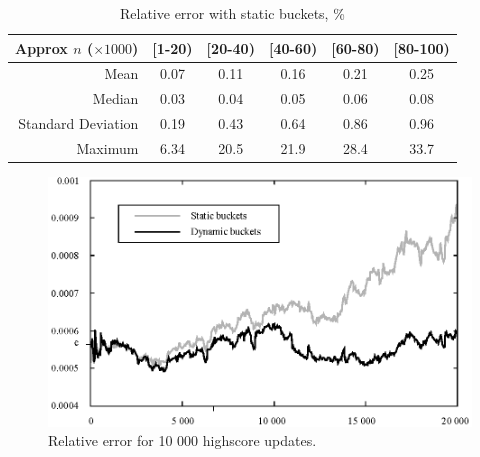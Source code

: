 \begin{table}[h]
  \vspace{4mm}
  \begin{center}
    \begin{tabular}{ r | c c c c c }
      Approx $n$ ($\times 1000$) & {[}1-20)           & {[}20-40) & {[}40-60) & {[}60-80) & {[}80-100)    \\ \hline
                Mean               & 0.07    & 0.11     & 0.16     & 0.21     & 0.25   \\
                Median             & 0.03    & 0.04     & 0.05     & 0.06     & 0.08   \\
                Standard Deviation & 0.19    & 0.43     & 0.64     & 0.86     & 0.96   \\
                Maximum            & 6.34    & 20.5     & 21.9     & 28.4     & 33.7   \\

    \end{tabular} 
    \caption{Relative error with static buckets, \%}
    \label{table:results-a}
  \end{center} 
\end{table}


\begin{figure}[h!]
  \centering
  \caption{Relative error for 10 000 highscore updates.}
  \label{fig:rel-error-10000}
  \includegraphics[width=13cm]{img/rel-error-10000.eps}
\end{figure}


